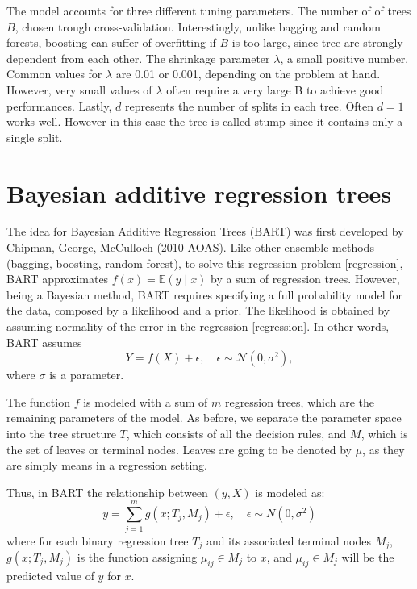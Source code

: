 \documentclass[a4paper,11pt]{article}
\begin{document}
The model accounts for three different tuning parameters. The number of of trees $B$, chosen trough cross-validation.  Interestingly, unlike bagging and random forests, boosting can suffer of overfitting if $B$ is too large, since tree are strongly dependent from each other. 
The shrinkage parameter $\lambda$, a small positive number. Common values for $\lambda$ are 0.01 or 0.001, depending on the problem at hand. However, very small values of $\lambda$ often require a very large B to achieve good performances. Lastly, $d$ represents the number of splits in each tree. Often $d=1$ works well. However in this case the tree is called stump since it contains only a single split.

\section{Bayesian additive regression trees}
\label{bart}

The idea for Bayesian Additive Regression Trees (BART) was first developed by Chipman, George, McCulloch (2010 AOAS). Like other ensemble methods (bagging, boosting, random forest), to solve this regression problem \eqref{regression}, BART approximates \( f(x) = \mathbb{E}(y \mid x) \) by a sum of regression trees. 
However, being a Bayesian method, BART requires specifying a full probability model for the data, composed by a likelihood and a prior. 
The likelihood is obtained by assuming normality of the error in the regression \eqref{regression}. In other words, BART assumes 
\begin{equation}
Y = f(X) + \epsilon, \quad \epsilon \sim \mathcal{N}(0, \sigma^2), \label{regression}
\end{equation}
where \( \sigma \) is a parameter.

The function $f$ is modeled with a sum of $m$ regression trees, which are the remaining parameters of the model. As before, we separate the parameter space into the tree structure $T$, which consists of all the decision rules, and $M$, which is the set of leaves or terminal nodes. Leaves are going to be denoted by $\mu$, as they are simply means in a  regression setting.

Thus, in BART the relationship between $(y, X)$ is modeled as: 
\begin{equation}
y = \sum_{j=1}^m g(x; T_j, M_j) + \epsilon, \quad \epsilon \sim N(0, \sigma^2) \label{firstlikelihood}
\end{equation}
where for each binary regression tree \( T_j \) and its associated terminal nodes  \( M_j \), \( g(x; T_j, M_j) \) is the function assigning \( \mu_{ij} \in M_j \)  to \( x \), and \( \mu_{ij} \in M_j \) will be the predicted value of $y$ for $x$. 
\end{document}
